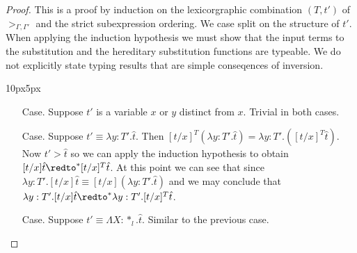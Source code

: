 \begin{proof}
  This is a proof by induction on the lexicorgraphic combination
$(T, t')$ of $>_{\Gamma,\Gamma'}$ and the strict subexpression ordering.
We case split on the structure of $t'$.  When applying
the induction hypothesis we must show that the input terms to the
substitution and the hereditary substitution functions are typeable.
We do not explicitly state typing results that are simple
conseqences of inversion.
\vspace{-25px}
\begin{changemargin}{10px}{5px}\noindent
\begin{itemize}
\item[Case.] Suppose $t'$ is a variable $x$ or $y$ distinct from $x$.  
  Trivial in both cases.
  
\item[Case.] Suppose $t' \equiv \lambda y:T'.\hat{t}$.  Then
  $[t/x]^T (\lambda y:T'.\hat{t}) = \lambda y:T'.([t/x]^T \hat{t})$. 
  Now $t' > \hat{t}$ so we can apply the induction hypothesis to obtain 
  $[t/x]\hat{t} \redto^* [t/x]^T \hat{t}$.  At this point we can see that since 
  $\lambda y:T'.[t/x]\hat{t} \equiv [t/x](\lambda y:T'.\hat{t})$ and we may
  conclude that $\lambda y:T'.[t/x]\hat{t} \redto^* \lambda y:T'.[t/x]^T \hat{t}$.
  
\item[Case.] Suppose $t' \equiv \Lambda X:*_l.\hat{t}$.  Similar to the previous case.  


\end{itemize}
\end{changemargin}
\end{proof}
